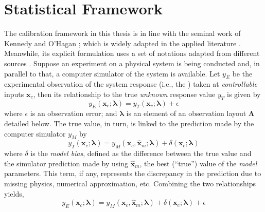 \section{Statistical Framework}\label{sec:bc_statistical_framework}

The calibration framework in this thesis is in line with the seminal work of Kennedy and O'Hagan \cite{Kennedy2001};
which is widely adapted in the applied literature \cite{Bayarri2007,Higdon2008,Arendt2012,Reichert2012}.
Meanwhile, its explicit formulation uses a set of notations adapted from different sources \cite{Kennedy2001,Santner2003,Huard2006,Reichert2012,Wicaksono2016}.
Suppose an experiment on a physical system is being conducted and, in parallel to that, a computer simulator of the system is available.
Let $y_E$ be the experimental observation of the system response (i.e., the ) taken at \emph{controllable} inputs $\bm{x}_c$,
then its relationship to the true \emph{unknown} response value $y_T$ is given by
\begin{equation}
    y_E(\bm{x}_c; \boldsymbol{\lambda}) = y_T (\bm{x}_c; \boldsymbol{\lambda}) + \epsilon
\label{eq:bc_observation_true}
\end{equation}
where $\epsilon$ is an observation error;
and $\boldsymbol{\lambda}$ is an element of an observation layout $\boldsymbol{\Lambda}$ detailed below.
The true value, in turn, is linked to the prediction made by the computer simulator $y_M$ by
\begin{equation}
    y_T(\bm{x}_c; \boldsymbol{\lambda}) = y_M (\bm{x}_c, \hat{\bm{x}}_m; \boldsymbol{\lambda}) + \delta (\bm{x}_c; \boldsymbol{\lambda})
\label{eq:bc_true_simulation}
\end{equation}
where $\delta$ is the \emph{model bias}, defined as the difference between the true value and the simulator prediction made by using $\hat{\bm{x}}_m$, the best (``true'') value of the \emph{model} parameters.
This term, if any, represents the discrepancy in the prediction due to missing physics, numerical approximation, etc. 
Combining the two relationships yields,
\begin{equation}
    y_E(\bm{x}_c; \boldsymbol{\lambda}) = y_M (\bm{x}_c, \hat{\bm{x}}_m; \boldsymbol{\lambda}) + \delta (\bm{x}_c; \boldsymbol{\lambda}) + \epsilon
\label{eq:bc_observation_true}
\end{equation}
